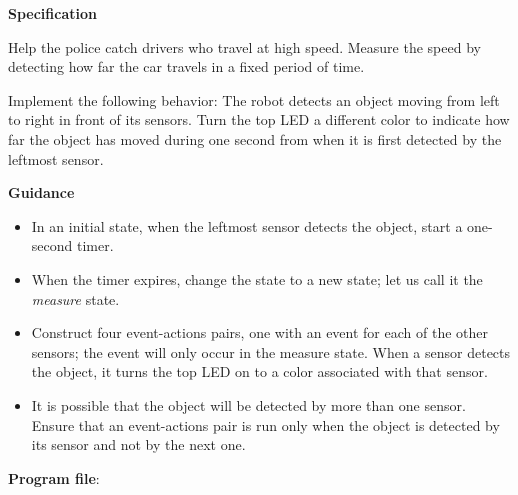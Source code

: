 
\label{ch.radar}

\textbf{Specification}

Help the police catch drivers who travel at high speed. Measure the
speed by detecting how far the car travels in a fixed period of time.

Implement the following behavior: The robot detects an object moving
from left to right in front of its sensors. Turn the top LED a different
color to indicate how far the object has moved during one second from
when it is first detected by the leftmost sensor.

\textbf{Guidance}

\begin{itemize}

\item In an initial state, when the leftmost sensor detects the object,
start a one-second timer.

\item When the timer expires, change the state to a new state; let us
call it the \emph{measure} state.

\item Construct four event-actions pairs, one with an event for each of
the other sensors; the event will only occur in the measure state. When
a sensor detects the object, it turns the top LED on to a color
associated with that sensor.

\item It is possible that the object will be detected by more than one
sensor. Ensure that an event-actions pair is run only when the object is
detected by its sensor and not by the next one.

\end{itemize}

\bigskip

{\raggedleft \hfill \textbf{Program file}: }
